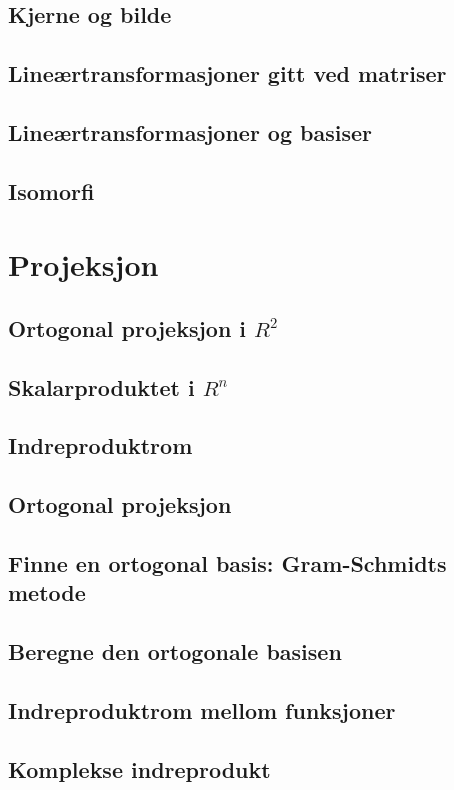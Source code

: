 \documentclass{article}
\begin{document}
\subsection{Kjerne og bilde}
\subsection{Lineærtransformasjoner gitt ved matriser}
\subsection{Lineærtransformasjoner og basiser}
\subsection{Isomorfi}


\section{Projeksjon}

\subsection{Ortogonal projeksjon i $R^2$}
\subsection{Skalarproduktet i $R^n$}
\subsection{Indreproduktrom}
\subsection{Ortogonal projeksjon}
\subsection{Finne en ortogonal basis: Gram-Schmidts metode}
\subsection{Beregne den ortogonale basisen}
\subsection{Indreproduktrom mellom funksjoner}
\subsection{Komplekse indreprodukt}
\end{document}
